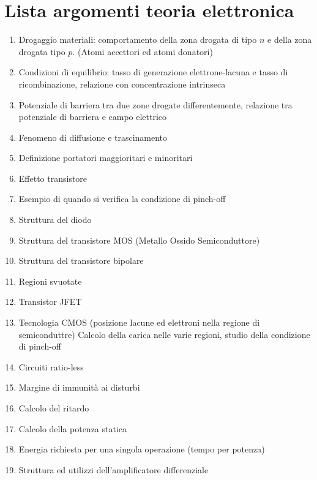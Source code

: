 \documentclass{article}
\begin{document}
\section*{Lista argomenti teoria elettronica}
\begin{enumerate}
    \item Drogaggio materiali: comportamento della zona drogata di tipo $n$ e della zona drogata tipo $p$. (Atomi accettori ed atomi donatori)
    \item Condizioni di equilibrio: tasso di generazione elettrone-lacuna e tasso di ricombinazione, relazione con concentrazione intrinseca
    \item Potenziale di barriera tra due zone drogate differentemente, relazione tra potenziale di barriera e campo elettrico
    \item Fenomeno di diffusione e trascinamento
    \item Definizione portatori maggioritari e minoritari
    \item Effetto transistore
    \item Esempio di quando si verifica la condizione di pinch-off
    \item Struttura del diodo
    \item Struttura del transistore MOS (Metallo Ossido Semiconduttore)
    \item Struttura del transistore bipolare
    \item Regioni svuotate
    \item Transistor JFET
    \item Tecnologia CMOS (posizione lacune ed elettroni nella regione di semiconduttre)
        Calcolo della carica nelle varie regioni, studio della condizione di pinch-off
    \item Circuiti ratio-less
    \item Margine di immunità ai disturbi
    \item Calcolo del ritardo
    \item Calcolo della potenza statica
    \item Energia richiesta per una singola operazione (tempo per potenza)
    \item Struttura ed utilizzi dell'amplificatore differenziale
\end{enumerate}
\end{document}
